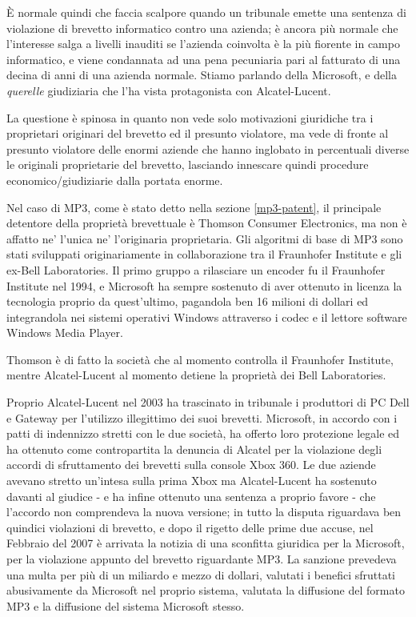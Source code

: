 \`E normale quindi che faccia scalpore quando un tribunale emette una sentenza di violazione di brevetto informatico contro una azienda; è ancora più normale che l'interesse salga a livelli inauditi se l'azienda coinvolta è la più fiorente in campo informatico, e viene condannata ad una pena pecuniaria pari al fatturato di una decina di anni di una azienda normale. Stiamo parlando della Microsoft, e della \textit{querelle} giudiziaria che l'ha vista protagonista con Alcatel-Lucent.

La questione è spinosa in quanto non vede solo motivazioni giuridiche tra i proprietari originari del brevetto ed il presunto violatore, ma vede di fronte al presunto violatore delle enormi aziende che hanno inglobato in percentuali diverse le originali proprietarie del brevetto, lasciando innescare quindi procedure economico/giudiziarie dalla portata enorme.

Nel caso di MP3, come è stato detto nella sezione \ref{mp3-patent}, il principale detentore della proprietà brevettuale è Thomson Consumer Electronics, ma non è affatto ne' l'unica ne' l'originaria proprietaria. Gli algoritmi di base di MP3 sono stati sviluppati originariamente in collaborazione tra il Fraunhofer Institute e gli ex-Bell Laboratories. Il primo gruppo a rilasciare un encoder fu il Fraunhofer Institute nel 1994, e Microsoft ha sempre sostenuto di aver ottenuto in licenza la tecnologia proprio da quest'ultimo, pagandola ben 16 milioni di dollari ed integrandola nei sistemi operativi Windows attraverso i codec e il lettore software Windows Media Player.

Thomson è di fatto la società che al momento controlla il Fraunhofer Institute, mentre Alcatel-Lucent al momento detiene la proprietà dei Bell Laboratories.

Proprio Alcatel-Lucent nel 2003 ha trascinato in tribunale i produttori di PC Dell e Gateway per l'utilizzo illegittimo dei suoi brevetti. Microsoft, in accordo con i patti di indennizzo stretti con le due società, ha offerto loro protezione legale ed ha ottenuto come contropartita la denuncia di Alcatel per la violazione degli accordi di sfruttamento dei brevetti sulla console Xbox 360. Le due aziende avevano stretto un'intesa sulla prima Xbox ma Alcatel-Lucent ha sostenuto davanti al giudice - e ha infine ottenuto una sentenza a proprio favore - che l'accordo non comprendeva la nuova versione; in tutto la disputa riguardava ben quindici violazioni di brevetto, e dopo il rigetto delle prime due accuse, nel Febbraio del 2007 è arrivata la notizia di una sconfitta giuridica per la Microsoft, per la violazione appunto del brevetto riguardante MP3. La sanzione prevedeva una multa per più di un miliardo e mezzo di dollari, valutati i benefici sfruttati abusivamente da Microsoft nel proprio sistema, valutata la diffusione del formato MP3 e la diffusione del sistema Microsoft stesso.

